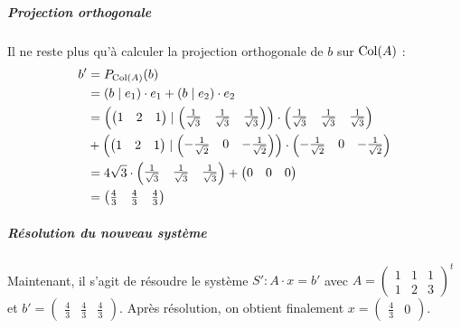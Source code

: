 \begin{exemple}
\subparagraph{Projection orthogonale}
Il ne reste plus qu'à calculer la projection orthogonale de $b$ sur $\mathrm{Col}(A)$ :
\begin{align*}
b' &= P_{\mathrm{Col}(A)}(b) \\
&= \left( b \mid e_1 \right) \cdot e_1 + \left( b \mid e_2 \right) \cdot e_2 \\
&= \left(  \begin{pmatrix} 1 & 2 & 1 \end{pmatrix}
 \mid  \begin{pmatrix} \frac{1}{\sqrt{3}} & \frac{1}{\sqrt{3}} & \frac{1}{\sqrt{3}} \end{pmatrix}
 \right) \cdot \begin{pmatrix} \frac{1}{\sqrt{3}} & \frac{1}{\sqrt{3}} & \frac{1}{\sqrt{3}} \end{pmatrix} \\
&+ \left(  \begin{pmatrix} 1 & 2 & 1 \end{pmatrix}
 \mid  \begin{pmatrix} - \frac{1}{\sqrt{2}} & 0 & - \frac{1}{\sqrt{2}} \end{pmatrix}
 \right) \cdot \begin{pmatrix} - \frac{1}{\sqrt{2}} & 0 & - \frac{1}{\sqrt{2}} \end{pmatrix} \\
&= 4\sqrt{3} \cdot \begin{pmatrix} \frac{1}{\sqrt{3}} & \frac{1}{\sqrt{3}} & \frac{1}{\sqrt{3}} \end{pmatrix} + \begin{pmatrix} 0 & 0 & 0 \end{pmatrix} \\
&= \begin{pmatrix} \frac{4}{3} & \frac{4}{3} & \frac{4}{3} \end{pmatrix}
\end{align*}

\subparagraph{Résolution du nouveau système}
Maintenant, il s'agit de résoudre le système $S' \colon A \cdot x = b'$ avec $A=\begin{pmatrix} 1 & 1 & 1 \\ 1 & 2 & 3 \end{pmatrix}^t$ et $b'=\begin{pmatrix} \frac{4}{3} & \frac{4}{3} & \frac{4}{3} \end{pmatrix}$. Après résolution, on obtient finalement $x=\begin{pmatrix} \frac{4}{3} & 0 \end{pmatrix}$.
\end{exemple}

